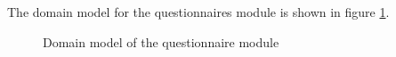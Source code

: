 The domain model for the questionnaires module is shown in figure \ref{fig:questionnaires _domainModel}.

\begin{figure}[htb]
\begin{center}
\end{center}
\caption{ Domain model of the questionnaire module \label{fig:questionnaires _domainModel}}
\end{figure}
